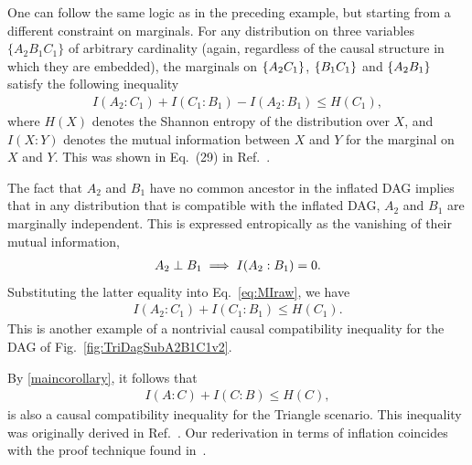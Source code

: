One can follow the same logic as in the preceding example, but starting from a different constraint on marginals.  For any distribution on three variables $\{A_2 B_1 C_1\}$ of arbitrary cardinality (again, regardless of the causal structure in which they are embedded), the marginals on $\left\lbrace A_2 C_1\right\rbrace$, $\left\lbrace B_1 C_1\right\rbrace$ and $\left\lbrace A_2 B_1\right\rbrace$ satisfy the following inequality
\begin{align}\label{eq:MIraw}
	I(A_2 : C_1) + I(C_1 : B_1) - I(A_2 : B_1) \leq H(C_1),	
\end{align}
where $H(X)$ denotes the Shannon entropy of the distribution over $X$, and $I(X: Y)$ denotes the mutual information between $X$ and $Y$ for the marginal on $X$ and $Y$.  This was shown in Eq.~(29) in Ref.~\cite{fritz2013marginal}.

The fact that $A_2$ and $B_1$ have no common ancestor in the inflated DAG implies that in any distribution that is compatible with the inflated DAG, $A_2$ and $B_1$ are marginally independent.  This is expressed entropically as the vanishing of their mutual information, 
\begin{align}\label{entropicfact}
A_2 \perp B_1 \implies  I(A_2 : B_1)  =0.
\end{align}
Substituting the latter equality into Eq.~\eqref{eq:MIraw}, we have
\begin{align}
	I(A_2 : C_1) + I(C_1 : B_1)  \leq H(C_1).
\end{align}
This is another example of a nontrivial causal compatibility inequality for the DAG of Fig.~\ref{fig:TriDagSubA2B1C1v2}.  

By \cref{maincorollary}, it follows that 
\begin{align}\label{eq:monogomyofcorrelations}
	I(A : C) + I(C : B) \leq H(C),
\end{align}
is also a causal compatibility inequality for the Triangle scenario.  This inequality was originally derived in Ref.~\cite{fritz2012bell}. Our rederivation in terms of inflation coincides with the proof technique found in~\citet{pusey2014gdag}.

